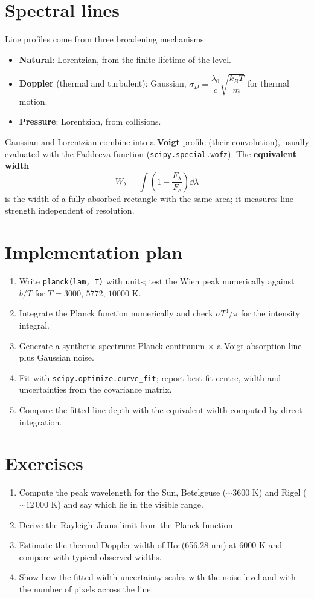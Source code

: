 \section{Spectral lines}
Line profiles come from three broadening mechanisms:
\begin{itemize}
\item \textbf{Natural}: Lorentzian, from the finite lifetime of the level.
\item \textbf{Doppler} (thermal and turbulent): Gaussian, $\sigma_D=\dfrac{\lambda_0}{c}\sqrt{\dfrac{k_BT}{m}}$ for thermal motion.
\item \textbf{Pressure}: Lorentzian, from collisions.
\end{itemize}
Gaussian and Lorentzian combine into a \textbf{Voigt} profile (their convolution), usually evaluated with the Faddeeva function (\texttt{scipy.special.wofz}). The \textbf{equivalent width}
\[
W_\lambda = \int\left(1-\frac{F_\lambda}{F_c}\right)\dd\lambda
\]
is the width of a fully absorbed rectangle with the same area; it measures line strength independent of resolution.

\section{Implementation plan}
\begin{enumerate}
\item Write \texttt{planck(lam, T)} with units; test the Wien peak numerically against $b/T$ for $T=3000$, $5772$, $10000$ K.
\item Integrate the Planck function numerically and check $\sigma T^4/\pi$ for the intensity integral.
\item Generate a synthetic spectrum: Planck continuum $\times$ a Voigt absorption line plus Gaussian noise.
\item Fit with \texttt{scipy.optimize.curve\_fit}; report best-fit centre, width and uncertainties from the covariance matrix.
\item Compare the fitted line depth with the equivalent width computed by direct integration.
\end{enumerate}

\section{Exercises}
\begin{enumerate}
\item Compute the peak wavelength for the Sun, Betelgeuse ($\sim3600$ K) and Rigel ($\sim12\,000$ K) and say which lie in the visible range.
\item Derive the Rayleigh--Jeans limit from the Planck function.
\item Estimate the thermal Doppler width of H$\alpha$ (656.28 nm) at 6000 K and compare with typical observed widths.
\item Show how the fitted width uncertainty scales with the noise level and with the number of pixels across the line.
\end{enumerate}

